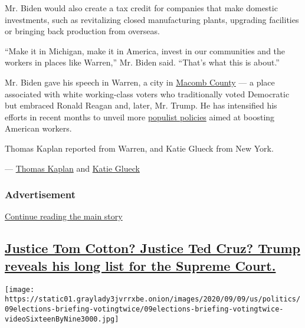 Mr. Biden would also create a tax credit for companies that make
domestic investments, such as revitalizing closed manufacturing plants,
upgrading facilities or bringing back production from overseas.

``Make it in Michigan, make it in America, invest in our communities and
the workers in places like Warren,'' Mr. Biden said. ``That's what this
is about.''

Mr. Biden gave his speech in Warren, a city in
\href{https://www.nytimes3xbfgragh.onion/2016/11/13/us/politics/michigan-voters-donald-trump.html}{Macomb
County} --- a place associated with white working-class voters who
traditionally voted Democratic but embraced Ronald Reagan and, later,
Mr. Trump. He has intensified his efforts in recent months to unveil
more
\href{https://www.nytimes3xbfgragh.onion/2020/07/09/us/politics/biden-buy-american.html}{populist
policies} aimed at boosting American workers.

Thomas Kaplan reported from Warren, and Katie Glueck from New York.

--- \href{https://www.nytimes3xbfgragh.onion/by/thomas-kaplan}{Thomas
Kaplan} and
\href{https://www.nytimes3xbfgragh.onion/by/katie-glueck}{Katie Glueck}

\hypertarget{advertisement}{%
\subsubsection{Advertisement}\label{advertisement}}

\protect\hyperlink{after-dfp-ad-mid1}{Continue reading the main story}

\hypertarget{justice-tom-cotton-justice-ted-cruz-trump-reveals-his-long-list-for-the-supreme-court}{%
\subsection{\texorpdfstring{\protect\hyperlink{justice-tom-cotton-justice-ted-cruz-trump-reveals-his-long-list-for-the-supreme-court}{Justice
Tom Cotton? Justice Ted Cruz? Trump reveals his long list for the
Supreme
Court.}}{Justice Tom Cotton? Justice Ted Cruz? Trump reveals his long list for the Supreme Court.}}\label{justice-tom-cotton-justice-ted-cruz-trump-reveals-his-long-list-for-the-supreme-court}}

\texttt{[image: https://static01.graylady3jvrrxbe.onion/images/2020/09/09/us/politics/09elections-briefing-votingtwice/09elections-briefing-votingtwice-videoSixteenByNine3000.jpg]}

